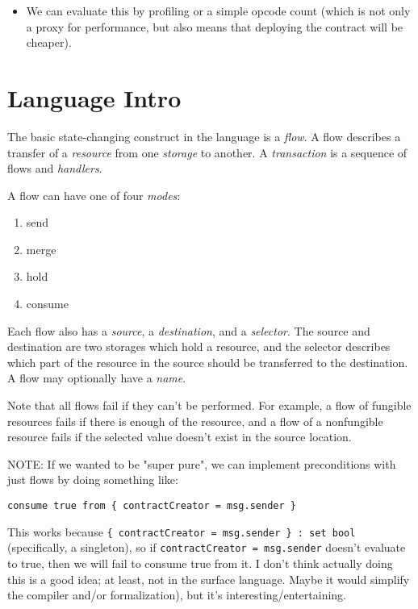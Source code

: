 \documentclass[10pt]{article}
\begin{document}
\begin{itemize}
        \begin{itemize}
            \item We can evaluate this by profiling or a simple opcode count (which is not only a proxy for performance, but also means that deploying the contract will be cheaper).
        \end{itemize}
\end{itemize}


\section{Language Intro}

The basic state-changing construct in the language is a \emph{flow}.
A flow describes a transfer of a \emph{resource} from one \emph{storage} to another.
A \emph{transaction} is a sequence of flows and \emph{handlers}.

A flow can have one of four \emph{modes}:
\begin{enumerate}
    \item send
    \item merge
    \item hold
    \item consume
\end{enumerate}

Each flow also has a \emph{source}, a \emph{destination}, and a \emph{selector}.
The source and destination are two storages which hold a resource, and the selector describes which part of the resource in the source should be transferred to the destination.
A flow may optionally have a \emph{name}.

Note that all flows fail if they can't be performed.
For example, a flow of fungible resources fails if there is enough of the resource, and a flow of a nonfungible resource fails if the selected value doesn't exist in the source location.

NOTE: If we wanted to be "super pure", we can implement preconditions with just flows by doing something like:
\begin{lstlisting}
consume true from { contractCreator = msg.sender }
\end{lstlisting}
This works because \lstinline|{ contractCreator = msg.sender } : set bool| (specifically, a singleton), so if \lstinline{contractCreator = msg.sender} doesn't evaluate to true, then we will fail to consume true from it.
I don't think actually doing this is a good idea; at least, not in the surface language.
Maybe it would simplify the compiler and/or formalization), but it's interesting/entertaining.
\end{document}

